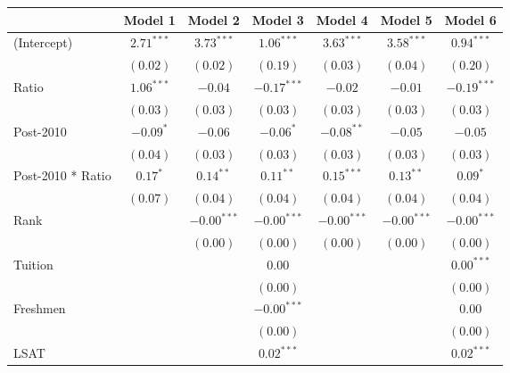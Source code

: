 \begin{table}
\begin{center}
\begin{tabular}{l c c c c c c }
\hline
                      & Model 1 & Model 2 & Model 3 & Model 4 & Model 5 & Model 6 \\
\hline
(Intercept)           & $2.71^{***}$ & $3.73^{***}$  & $1.06^{***}$  & $3.63^{***}$  & $3.58^{***}$  & $0.94^{***}$  \\
                      & $(0.02)$     & $(0.02)$      & $(0.19)$      & $(0.03)$      & $(0.04)$      & $(0.20)$      \\
Ratio                 & $1.06^{***}$ & $-0.04$       & $-0.17^{***}$ & $-0.02$       & $-0.01$       & $-0.19^{***}$ \\
                      & $(0.03)$     & $(0.03)$      & $(0.03)$      & $(0.03)$      & $(0.03)$      & $(0.03)$      \\
Post-2010             & $-0.09^{*}$  & $-0.06$       & $-0.06^{*}$   & $-0.08^{**}$  & $-0.05$       & $-0.05$       \\
                      & $(0.04)$     & $(0.03)$      & $(0.03)$      & $(0.03)$      & $(0.03)$      & $(0.03)$      \\
Post-2010 * Ratio     & $0.17^{*}$   & $0.14^{**}$   & $0.11^{**}$   & $0.15^{***}$  & $0.13^{**}$   & $0.09^{*}$    \\
                      & $(0.07)$     & $(0.04)$      & $(0.04)$      & $(0.04)$      & $(0.04)$      & $(0.04)$      \\
Rank                  &              & $-0.00^{***}$ & $-0.00^{***}$ & $-0.00^{***}$ & $-0.00^{***}$ & $-0.00^{***}$ \\
                      &              & $(0.00)$      & $(0.00)$      & $(0.00)$      & $(0.00)$      & $(0.00)$      \\
Tuition               &              &               & $0.00$        &               &               & $0.00^{***}$  \\
                      &              &               & $(0.00)$      &               &               & $(0.00)$      \\
Freshmen              &              &               & $-0.00^{***}$ &               &               & $0.00$        \\
                      &              &               & $(0.00)$      &               &               & $(0.00)$      \\
LSAT                  &              &               & $0.02^{***}$  &               &               & $0.02^{***}$  \\

\end{tabular}
\end{center}
\end{table}
